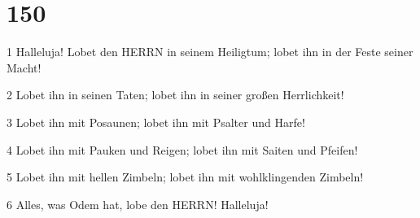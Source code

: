 \chapter{150}

\par 1 Halleluja! Lobet den HERRN in seinem Heiligtum; lobet ihn in der Feste seiner Macht!
\par 2 Lobet ihn in seinen Taten; lobet ihn in seiner großen Herrlichkeit!
\par 3 Lobet ihn mit Posaunen; lobet ihn mit Psalter und Harfe!
\par 4 Lobet ihn mit Pauken und Reigen; lobet ihn mit Saiten und Pfeifen!
\par 5 Lobet ihn mit hellen Zimbeln; lobet ihn mit wohlklingenden Zimbeln!
\par 6 Alles, was Odem hat, lobe den HERRN! Halleluja!



